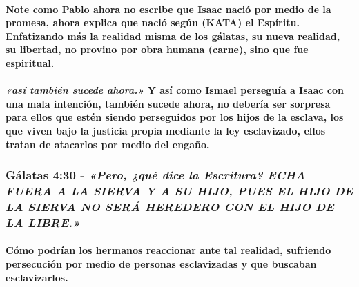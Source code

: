 \documentclass[11a pt,twoside]{article}
\newcommand{\scripture}[1]{%
  {\fontsize{12pt}{16pt}\selectfont\ScriptureFont\itshape #1}%
}
\let\oldsubsubsection\subsubsection
\renewcommand{\subsubsection}{\needspace{4\baselineskip}\oldsubsubsection}
\let\oldparagraph\paragraph
\renewcommand{\paragraph}{\needspace{3\baselineskip}\oldparagraph}
\begin{document}
\paragraph{Note como Pablo ahora no escribe que Isaac nació por medio de
la promesa, ahora explica que nació según (KATA) el Espíritu.
Enfatizando más la realidad misma de los gálatas, su nueva realidad, su
libertad, no provino por obra humana (carne), sino que fue
espiritual.}\label{note-como-pablo-ahora-no-escribe-que-isaac-naciuxf3-por-medio-de-la-promesa-ahora-explica-que-naciuxf3-seguxfan-kata-el-espuxedritu.-enfatizando-muxe1s-la-realidad-misma-de-los-guxe1latas-su-nueva-realidad-su-libertad-no-provino-por-obra-humana-carne-sino-que-fue-espiritual.}

\paragraph{\texorpdfstring{\scripture{«así también sucede ahora.»} Y así
como Ismael perseguía a Isaac con una mala intención, también sucede
ahora, no debería ser sorpresa para ellos que estén siendo perseguidos
por los hijos de la esclava, los que viven bajo la justicia propia
mediante la ley esclavizado, ellos tratan de atacarlos por medio del
engaño.}{ Y así como Ismael perseguía a Isaac con una mala intención, también sucede ahora, no debería ser sorpresa para ellos que estén siendo perseguidos por los hijos de la esclava, los que viven bajo la justicia propia mediante la ley esclavizado, ellos tratan de atacarlos por medio del engaño.}}\label{asuxed-tambiuxe9n-sucede-ahora.-y-asuxed-como-ismael-perseguuxeda-a-isaac-con-una-mala-intenciuxf3n-tambiuxe9n-sucede-ahora-no-deberuxeda-ser-sorpresa-para-ellos-que-estuxe9n-siendo-perseguidos-por-los-hijos-de-la-esclava-los-que-viven-bajo-la-justicia-propia-mediante-la-ley-esclavizado-ellos-tratan-de-atacarlos-por-medio-del-engauxf1o.}

\subsubsection{\texorpdfstring{Gálatas 4:30 -
\scripture{«Pero, ¿qué dice la Escritura? ECHA FUERA A LA SIERVA Y A SU HIJO, PUES EL HIJO DE LA SIERVA NO SERÁ HEREDERO CON EL HIJO DE LA LIBRE.»}}{Gálatas 4:30 - }}\label{guxe1latas-430---pero-quuxe9-dice-la-escritura-echa-fuera-a-la-sierva-y-a-su-hijo-pues-el-hijo-de-la-sierva-no-seruxe1-heredero-con-el-hijo-de-la-libre.}

\paragraph{Cómo podrían los hermanos reaccionar ante tal realidad,
sufriendo persecución por medio de personas esclavizadas y que buscaban
esclavizarlos.}\label{cuxf3mo-podruxedan-los-hermanos-reaccionar-ante-tal-realidad-sufriendo-persecuciuxf3n-por-medio-de-personas-esclavizadas-y-que-buscaban-esclavizarlos.}
\end{document}
